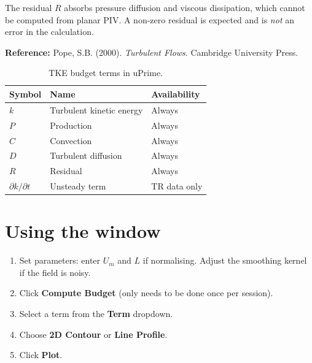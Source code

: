 \documentclass[11pt, a4paper]{report}
\newcommand{\uipth}[1]{\textbf{\textcolor{upblue}{#1}}}
\begin{document}
\begin{notebox}
The residual $R$ absorbs pressure diffusion and viscous dissipation, which cannot be computed from planar PIV. A non-zero residual is expected and is \emph{not} an error in the calculation.
\end{notebox}

\noindent\textbf{Reference:} Pope, S.B. (2000). \textit{Turbulent Flows}. Cambridge University Press.

\begin{table}[htbp]
\centering
\caption{TKE budget terms in uPrime.}
\begin{tabular}{lll}
\toprule
\textbf{Symbol} & \textbf{Name} & \textbf{Availability} \\
\midrule
$k$                     & Turbulent kinetic energy  & Always \\
$P$                     & Production                & Always \\
$C$                     & Convection                & Always \\
$D$                     & Turbulent diffusion       & Always \\
$R$                     & Residual                  & Always \\
$\partial k/\partial t$ & Unsteady term             & TR data only \\
\bottomrule
\end{tabular}
\end{table}

\section{Using the window}

\begin{stepbox}
\begin{enumerate}[leftmargin=1.5em, topsep=2pt]
  \item Set parameters: enter $U_m$ and $L$ if normalising. Adjust the smoothing kernel if the field is noisy.
  \item Click \uipth{Compute Budget} (only needs to be done once per session).
  \item Select a term from the \uipth{Term} dropdown.
  \item Choose \uipth{2D Contour} or \uipth{Line Profile}.
  \item Click \uipth{Plot}.
\end{enumerate}
\end{stepbox}
\end{document}
